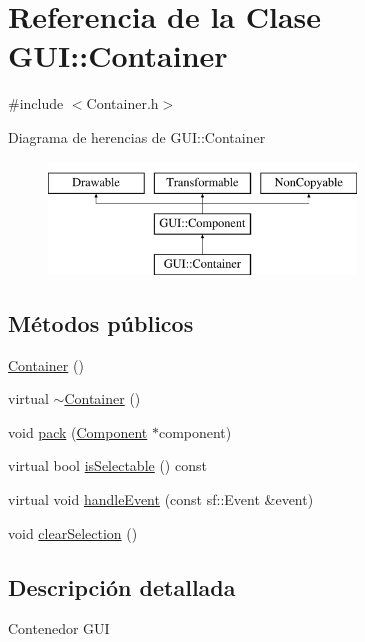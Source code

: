 \hypertarget{classGUI_1_1Container}{}\section{Referencia de la Clase G\+U\+I\+:\+:Container}
\label{classGUI_1_1Container}


{\ttfamily \#include $<$Container.\+h$>$}

Diagrama de herencias de G\+U\+I\+:\+:Container\begin{figure}[H]
\begin{center}
\leavevmode
\includegraphics[height=3.000000cm]{classGUI_1_1Container}
\end{center}
\end{figure}
\subsection*{Métodos públicos}
\begin{DoxyCompactItemize}
\item 
\hyperlink{classGUI_1_1Container_a29ad430d6a9f0bebfea8567c91de1095}{Container} ()
\item 
virtual \hyperlink{classGUI_1_1Container_a6f08a80f950b90f542a2b29e980e7e79}{$\sim$\+Container} ()
\item 
void \hyperlink{classGUI_1_1Container_a9ed6e67b7c809fac99e30594d34a71c2}{pack} (\hyperlink{classGUI_1_1Component}{Component} $\ast$component)
\item 
virtual bool \hyperlink{classGUI_1_1Container_a0780d6dc5502c171a8d35e97fa93122d}{is\+Selectable} () const 
\item 
virtual void \hyperlink{classGUI_1_1Container_af08db9d157a4e56f706493529901eb7f}{handle\+Event} (const sf\+::\+Event \&event)
\item 
void \hyperlink{classGUI_1_1Container_a74aa11be28be40edc394fc585c335e74}{clear\+Selection} ()
\end{DoxyCompactItemize}


\subsection{Descripción detallada}
Contenedor G\+U\+I 

